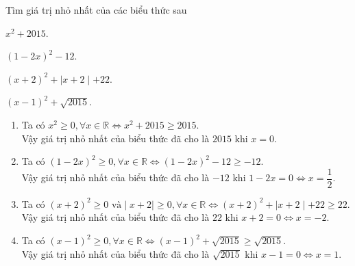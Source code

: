 \begin{bt}%
	Tìm giá trị nhỏ nhất của các biểu thức sau
	\begin{listEX}[2]
		\item $x^{2}+2015$.
		\item $(1-2x)^{2}-12$.
		\item $(x+2)^{2}+ \mid x+2 \mid +22$.
		\item $(x-1)^{2}+\sqrt{2015}$.
	\end{listEX}
	\loigiai
	{
		\begin{enumerate}
			\item Ta có $x^{2} \geq 0, \forall x \in  \mathbb{R} \Leftrightarrow x^{2}+2015 \geq 2015 $. \\
			Vậy giá trị nhỏ nhất của biểu thức đã cho là $2015$ khi $x=0$.  
			\item Ta có $(1-2x)^{2} \geq 0, \forall x \in  \mathbb{R} \Leftrightarrow (1-2x)^{2}-12 \geq -12 $. \\
			Vậy giá trị nhỏ nhất của biểu thức đã cho là $-12$ khi $1-2x=0 \Leftrightarrow x= \dfrac{1}{2}$.
			\item Ta có $(x+2)^{2} \geq 0 \text{ và} \mid x+2 \mid \geq 0, \forall x \in  \mathbb{R} \Leftrightarrow (x+2)^{2}+ \mid x+2 \mid + 22 \geq 22 $. \\
			Vậy giá trị nhỏ nhất của biểu thức đã cho là $22$ khi $x+2=0 \Leftrightarrow x= -2$.
			\item Ta có $(x-1)^{2} \geq 0, \forall x \in  \mathbb{R} \Leftrightarrow (x-1)^{2}+ \sqrt{2015} \geq \sqrt{2015} $.\\
			Vậy giá trị nhỏ nhất của biểu thức đã cho là $\sqrt{2015}$ khi $x-1=0 \Leftrightarrow x=1$.
		\end{enumerate}
	}
\end{bt}


